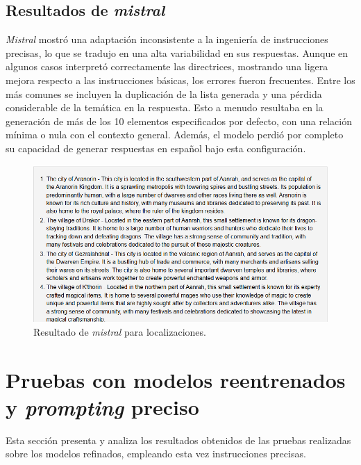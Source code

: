 \subsection{Resultados de \textit{mistral}}
\textit{Mistral} mostró una adaptación inconsistente a la ingeniería de instrucciones precisas,
lo que se tradujo en una alta variabilidad en sus respuestas.
Aunque en algunos casos interpretó correctamente las directrices,
mostrando una ligera mejora respecto a las instrucciones básicas,
los errores fueron frecuentes. Entre los más comunes se incluyen la duplicación de la lista generada y
una pérdida considerable de la temática en la respuesta. Esto a menudo resultaba en la generación de más de los 10 elementos especificados por defecto,
con una relación mínima o nula con el contexto general.
Además, el modelo perdió por completo su capacidad de generar respuestas en español bajo esta configuración.

\begin{figure}[htbp]
	\centering
	\includegraphics[width=1\textwidth]{./Figures/mistral-prompt-locations.png}
	\caption{Resultado de \textit{mistral} para localizaciones.}
	\label{fig:mistral-prompt-locations}
\end{figure}

\section{Pruebas con modelos reentrenados y \textit{prompting} preciso}
Esta sección presenta y analiza los resultados obtenidos de las pruebas realizadas sobre los modelos refinados,
empleando esta vez instrucciones precisas.

